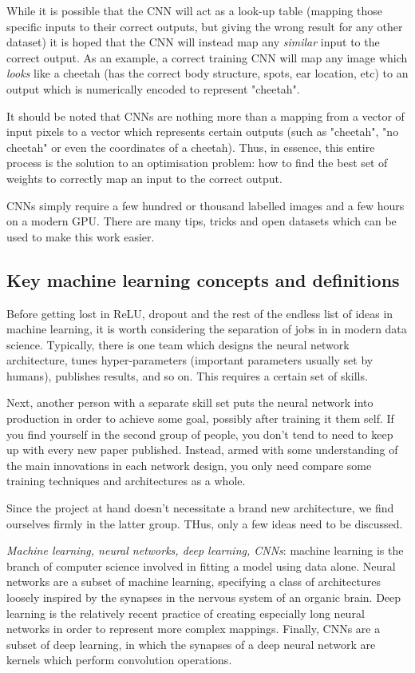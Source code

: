 While it is possible that the CNN will act as a look-up table (mapping those specific inputs to their correct outputs, but giving the wrong result for any other dataset) it is hoped that the CNN will instead map any \emph{similar} input to the correct output. As an example, a correct training CNN will map any image which \emph{looks} like a cheetah (has the correct body structure, spots, ear location, etc) to an output which is numerically encoded to represent "cheetah".

It should be noted that CNNs are nothing more than a mapping from a vector of input pixels to a vector which represents certain outputs (such as "cheetah", "no cheetah" or even the coordinates of a cheetah). Thus, in essence, this entire process is the solution to an optimisation problem: how to find the best set of weights to correctly map an input to the correct output.

CNNs simply require a few hundred or thousand labelled images and a few hours on a modern GPU. There are many tips, tricks and open datasets which can be used to make this work easier.

\subsection{Key machine learning concepts and definitions}
Before getting lost in ReLU, dropout and the rest of the endless list of ideas in machine learning, it is worth considering the separation of jobs in in modern data science. Typically, there is one team which designs the neural network architecture, tunes hyper-parameters (important parameters usually set by humans), publishes results, and so on. This requires a certain set of skills.

Next, another person with a separate skill set puts the neural network into production in order to achieve some goal, possibly after training it them self. If you find yourself in the second group of people, you don't tend to need to keep up with every new paper published. Instead, armed with some understanding of the main innovations in each network design, you only need compare some training techniques and architectures as a whole.

Since the project at hand doesn't necessitate a brand new architecture, we find ourselves firmly in the latter group. THus, only a few ideas need to be discussed.

\textit{Machine learning, neural networks, deep learning, CNNs}: machine learning is the branch of computer science involved in fitting a model using data alone. Neural networks are a subset of machine learning, specifying a class of architectures loosely inspired by the synapses in the nervous system of an organic brain. Deep learning is the relatively recent practice of creating especially long neural networks in order to represent more complex mappings. Finally, CNNs are a subset of deep learning, in which the synapses of a deep neural network are kernels which perform convolution operations.

